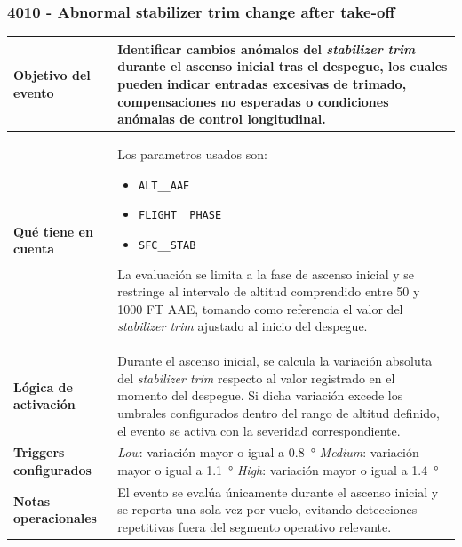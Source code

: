 \documentclass[11pt,a4paper]{article}
\begin{document}
	\subsubsection{4010 - Abnormal stabilizer trim change after take-off}
	\begin{table}[H]
		\centering
		\renewcommand{\arraystretch}{1.3}
		\begin{tabular}{p{5cm} p{9.5cm}}
			\hline
			\textbf{Objetivo del evento} &
			Identificar cambios anómalos del \textit{stabilizer trim} durante el ascenso inicial tras el despegue, los cuales pueden indicar entradas excesivas de trimado, compensaciones no esperadas o condiciones anómalas de control longitudinal. \\
			\hline
			\textbf{Qué tiene en cuenta} & Los parametros usados son:
			\begin{itemize}
				\item \texttt{ALT\_\_AAE}
				\item \texttt{FLIGHT\_\_PHASE}
				\item \texttt{SFC\_\_STAB}
			\end{itemize}
			La evaluación se limita a la fase de ascenso inicial y se restringe al intervalo de altitud comprendido entre \SI{50}{} y \SI{1000}{} FT AAE, tomando como referencia el valor del \textit{stabilizer trim} ajustado al inicio del despegue. \\
			\hline
			\textbf{Lógica de activación} &
			Durante el ascenso inicial, se calcula la variación absoluta del \textit{stabilizer trim} respecto al valor registrado en el momento del despegue. Si dicha variación excede los umbrales configurados dentro del rango de altitud definido, el evento se activa con la severidad correspondiente. \\
			\hline
			\textbf{Triggers configurados} &
			\textit{Low}: variación mayor o igual a \SI{0.8}{\degree} \newline
			\textit{Medium}: variación mayor o igual a \SI{1.1}{\degree} \newline
			\textit{High}: variación mayor o igual a \SI{1.4}{\degree} \\
			\hline
			\textbf{Notas operacionales} &
			El evento se evalúa únicamente durante el ascenso inicial y se reporta una sola vez por vuelo, evitando detecciones repetitivas fuera del segmento operativo relevante. \\
			\hline
		\end{tabular}
	\end{table}
	
\end{document}
